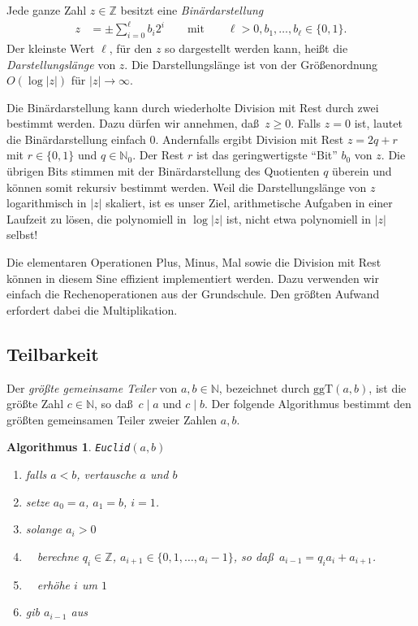 \documentclass[10pt,reqno]{amsart}
\numberwithin{equation}{section}
\newcommand\ggt{\ggT}
\newcommand\ggT{\mathrm{ggT}}
\newcommand\NN{\mathbb N}
\newcommand\ZZ{\mathbb Z}
\newtheorem{algorithm}[definition]{Algorithmus}
\begin{document}
Jede ganze Zahl $z\in\ZZ$ besitzt eine {\em Bin\"ardarstellung}
	\begin{align*}
		z&=\pm\sum_{i=0}^\ell b_i2^i\qquad\mbox{mit}\qquad \ell>0,b_1,\ldots,b_\ell\in\{0,1\}.
	\end{align*}
Der kleinste Wert $\ell$, f\"ur den $z$ so dargestellt werden kann, hei\ss t die {\em Darstellungsl\"ange} von $z$.
Die Darstellungsl\"ange ist von der Gr\"o\ss enordnung $O(\log|z|)$ f\"ur $|z|\to\infty$.

Die Bin\"ardarstellung kann durch wiederholte Division mit Rest durch zwei bestimmt werden.
Dazu d\"urfen wir annehmen, da\ss\ $z\geq0$.
Falls $z=0$ ist, lautet die Bin\"ardarstellung einfach $0$.
Andernfalls ergibt Division mit Rest $z=2q+r$ mit $r\in\{0,1\}$ und $q\in\NN_0$.
Der Rest $r$ ist das geringwertigste ``Bit'' $b_0$ von $z$.
Die \"ubrigen Bits stimmen mit der Bin\"ardarstellung des Quotienten $q$ \"uberein und k\"onnen somit rekursiv bestimmt werden.
Weil die Darstellungsl\"ange von $z$ logarithmisch in $|z|$ skaliert, ist es unser Ziel, arithmetische Aufgaben in einer Laufzeit zu l\"osen, die polynomiell in $\log|z|$ ist, nicht etwa polynomiell in $|z|$ selbst!

Die elementaren Operationen Plus, Minus, Mal sowie die Division mit Rest k\"onnen in diesem Sine effizient implementiert werden.
Dazu verwenden wir einfach die Rechenoperationen aus der Grundschule.
Den gr\"o\ss ten Aufwand erfordert dabei die Multiplikation.

\subsection{Teilbarkeit}\label{sec_div}
Der {\em gr\"o\ss te gemeinsame Teiler} von $a,b\in\NN$, bezeichnet durch $\ggt(a,b)$, ist die gr\"o\ss te Zahl $c\in\NN$, so da\ss\ $c\mid a$ und $c\mid b$.
Der folgende Algorithmus bestimmt den gr\"o\ss ten gemeinsamen Teiler zweier Zahlen $a,b$.

\begin{algorithm}
	{\tt Euclid}$(a,b)$
	\begin{enumerate}
		\item falls $a<b$, vertausche $a$ und $b$
		\item setze $a_0=a$, $a_1=b$, $i=1$.
		\item solange $a_i>0$
		\item $\quad$berechne $q_i\in\ZZ$, $a_{i+1}\in\{0,1,\ldots,a_i-1\}$, so da\ss\ $a_{i-1}=q_ia_i+a_{i+1}$.
		\item $\quad$erh\"ohe $i$ um $1$
		\item gib $a_{i-1}$ aus
	\end{enumerate}
\end{algorithm}
\end{document}
